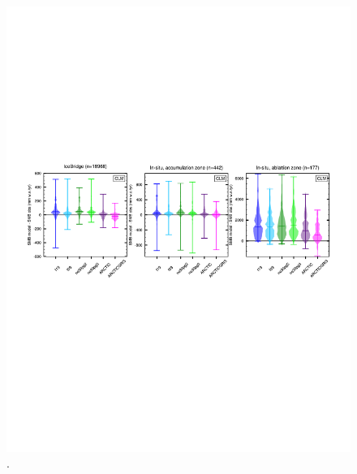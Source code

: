 \documentclass[draft]{agujournal2019}
\begin{document}
\begin{figure}[t]
\begin{center}
         \includegraphics[width=130mm]{figs/temp_violens.pdf}
\end{center}
\caption{.}
\label{fig:pointdiff}
\end{figure}
\end{document}
